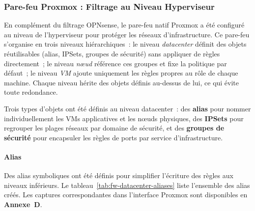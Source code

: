 \subsubsection{Pare-feu Proxmox : Filtrage au Niveau Hyperviseur}

\par En complément du filtrage OPNsense, le pare-feu natif Proxmox a été
configuré au niveau de l'hyperviseur pour protéger les réseaux
d'infrastructure. Ce pare-feu s'organise en trois niveaux hiérarchiques~:
le niveau \textit{datacenter} définit des objets réutilisables (alias,
IPSets, groupes de sécurité) sans appliquer de règles directement~; le
niveau \textit{nœud} référence ces groupes et fixe la politique par
défaut~; le niveau \textit{VM} ajoute uniquement les règles propres au rôle
de chaque machine. Chaque niveau hérite des objets définis au-dessus de lui,
ce qui évite toute redondance.\\


\par Trois types d'objets ont été définis au niveau datacenter~: des
\textbf{alias} pour nommer individuellement les VMs applicatives et les
nœuds physiques, des \textbf{IPSets} pour regrouper les plages réseaux par
domaine de sécurité, et des \textbf{groupes de sécurité} pour encapsuler
les règles de ports par service d'infrastructure.\\

\paragraph{Alias}

\par Des alias symboliques ont été définis pour simplifier l'écriture des
règles aux niveaux inférieurs. Le tableau~\ref{tab:fw-datacenter-aliases}
liste l'ensemble des alias créés. Les captures correspondantes dans
l'interface Proxmox sont disponibles en \textbf{Annexe~D}.


